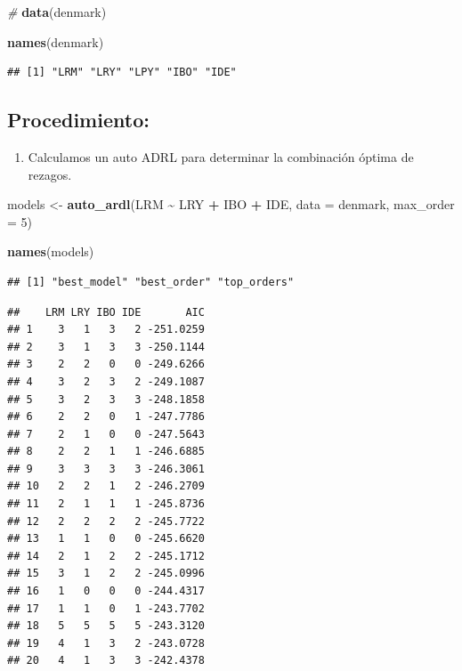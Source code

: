 \documentclass[
]{book}
\newenvironment{Shaded}{\begin{snugshade}}{\end{snugshade}}
\newcommand{\AttributeTok}[1]{\textcolor[rgb]{0.13,0.29,0.53}{#1}}
\newcommand{\CommentTok}[1]{\textcolor[rgb]{0.56,0.35,0.01}{\textit{#1}}}
\newcommand{\DecValTok}[1]{\textcolor[rgb]{0.00,0.00,0.81}{#1}}
\newcommand{\FunctionTok}[1]{\textcolor[rgb]{0.13,0.29,0.53}{\textbf{#1}}}
\newcommand{\NormalTok}[1]{#1}
\newcommand{\OtherTok}[1]{\textcolor[rgb]{0.56,0.35,0.01}{#1}}
\newcommand{\SpecialCharTok}[1]{\textcolor[rgb]{0.81,0.36,0.00}{\textbf{#1}}}
\providecommand{\tightlist}{%
  \setlength{\itemsep}{0pt}\setlength{\parskip}{0pt}}
\begin{document}
\begin{Shaded}
\begin{Highlighting}[]
\CommentTok{\#}
\FunctionTok{data}\NormalTok{(denmark)}

\FunctionTok{names}\NormalTok{(denmark)}
\end{Highlighting}
\end{Shaded}

\begin{verbatim}
## [1] "LRM" "LRY" "LPY" "IBO" "IDE"
\end{verbatim}

\hypertarget{procedimiento}{%
\subsection{Procedimiento:}\label{procedimiento}}

\begin{enumerate}
\def\labelenumi{\arabic{enumi}.}
\tightlist
\item
  Calculamos un auto ADRL para determinar la combinación óptima de rezagos.
\end{enumerate}

\begin{Shaded}
\begin{Highlighting}[]
\NormalTok{models }\OtherTok{\textless{}{-}} \FunctionTok{auto\_ardl}\NormalTok{(LRM }\SpecialCharTok{\textasciitilde{}}\NormalTok{ LRY }\SpecialCharTok{+}\NormalTok{ IBO }\SpecialCharTok{+}\NormalTok{ IDE, }\AttributeTok{data =}\NormalTok{ denmark, }\AttributeTok{max\_order =} \DecValTok{5}\NormalTok{)}

\FunctionTok{names}\NormalTok{(models)}
\end{Highlighting}
\end{Shaded}

\begin{verbatim}
## [1] "best_model" "best_order" "top_orders"
\end{verbatim}

\begin{Shaded}
\end{Shaded}

\begin{verbatim}
##    LRM LRY IBO IDE       AIC
## 1    3   1   3   2 -251.0259
## 2    3   1   3   3 -250.1144
## 3    2   2   0   0 -249.6266
## 4    3   2   3   2 -249.1087
## 5    3   2   3   3 -248.1858
## 6    2   2   0   1 -247.7786
## 7    2   1   0   0 -247.5643
## 8    2   2   1   1 -246.6885
## 9    3   3   3   3 -246.3061
## 10   2   2   1   2 -246.2709
## 11   2   1   1   1 -245.8736
## 12   2   2   2   2 -245.7722
## 13   1   1   0   0 -245.6620
## 14   2   1   2   2 -245.1712
## 15   3   1   2   2 -245.0996
## 16   1   0   0   0 -244.4317
## 17   1   1   0   1 -243.7702
## 18   5   5   5   5 -243.3120
## 19   4   1   3   2 -243.0728
## 20   4   1   3   3 -242.4378
\end{verbatim}
\end{document}
